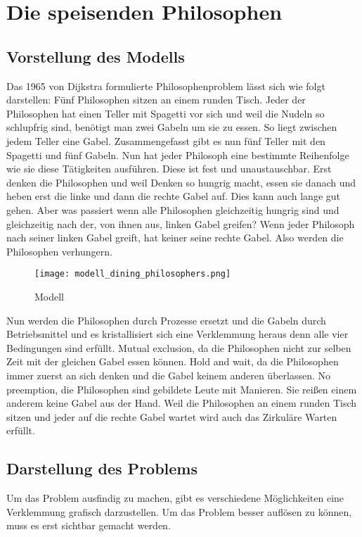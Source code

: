 \chapter{Die speisenden Philosophen}
\label{speisende_philosophen}
\section{Vorstellung des Modells}
\label{vorstellung}
Das 1965 von Dijkstra formulierte Philosophenproblem lässt sich wie folgt darstellen: Fünf Philosophen sitzen an einem runden Tisch. Jeder der Philosophen hat einen Teller mit Spagetti vor sich und weil die Nudeln so schlupfrig sind, benötigt man zwei Gabeln um sie zu essen. So liegt zwischen jedem Teller eine Gabel. Zusammengefasst gibt es nun fünf Teller mit den Spagetti und fünf Gabeln. Nun hat jeder Philosoph eine bestimmte Reihenfolge wie sie diese Tätigkeiten ausführen. Diese ist fest und unaustauschbar. Erst denken die Philosophen und weil Denken so hungrig macht, essen sie danach und heben erst die linke und dann die rechte Gabel auf. Dies kann auch lange gut gehen. Aber was passiert wenn alle Philosophen gleichzeitig hungrig sind und gleichzeitig nach der, von ihnen aus, linken Gabel greifen? Wenn jeder Philosoph nach seiner linken Gabel greift, hat keiner seine rechte Gabel. Also werden die Philosophen verhungern.\parencite[vgl.][S.220]{tanenbaum2016} 

\begin{figure}[H]
\caption{Modell \parencite{philosophers}}
\label{fig:modell}
\centering
\texttt{[image: modell\_dining\_philosophers.png]}
\end{figure}

Nun werden die Philosophen durch Prozesse ersetzt und die Gabeln durch Betriebsmittel und es kristallisiert sich eine Verklemmung heraus denn alle vier Bedingungen sind erfüllt. Mutual exclusion, da die Philosophen nicht zur selben Zeit mit der gleichen Gabel essen können. Hold and wait, da die Philosophen immer zuerst an sich denken und die Gabel keinem anderen überlassen. No preemption, die Philosophen sind gebildete Leute mit Manieren. Sie reißen einem anderem keine Gabel aus der Hand. Weil die Philosophen an einem runden Tisch sitzen und jeder auf die rechte Gabel wartet wird auch das Zirkuläre Warten erfüllt.

\section{Darstellung des Problems}
\label{problem}
Um das Problem ausfindig zu machen, gibt es verschiedene Möglichkeiten eine Verklemmung grafisch darzustellen. Um das Problem besser auflösen zu können, muss es erst sichtbar gemacht werden.

